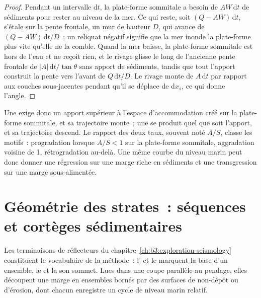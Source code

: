 \begin{proof}
Pendant un intervalle $\mathrm dt$, la plate-forme sommitale a besoin de $AW\,\mathrm dt$ de sédiments pour
rester au niveau de la mer. Ce qui reste, soit $(Q - AW)\,\mathrm dt$, s'étale sur la pente frontale,
un mur de hauteur $D$, qui avance de $(Q - AW)\,\mathrm dt/D$~; un reliquat négatif
signifie que la mer inonde la plate-forme plus vite qu'elle ne la comble. Quand la mer
baisse, la plate-forme sommitale est hors de l'eau et ne reçoit rien, et le rivage
glisse le long de l'ancienne pente frontale de $|A|\,\mathrm dt/\tan\theta$ sans
apport de sédiments, tandis que tout l'apport construit la pente vers l'avant de $Q\,\mathrm
dt/D$. Le rivage monte de $A\,\mathrm dt$ par rapport aux couches sous-jacentes
pendant qu'il se déplace de $\mathrm dx_s$, ce qui donne l'angle.
\end{proof}

Une  exige donc un apport supérieur à l'espace d'accommodation
créé sur la plate-forme sommitale, et sa trajectoire monte~; une  se produit
quel que soit l'apport, et sa trajectoire descend. Le rapport des deux taux,
souvent noté $A/S$, classe les motifs~: progradation lorsque $A/S < 1$ sur la
plate-forme sommitale, aggradation voisine de 1, rétrogradation au-delà. Une même courbe du niveau marin
peut donc donner une régression sur une marge riche en sédiments et une
transgression sur une marge sous-alimentée.

\section{Géométrie des strates~: séquences et cortèges sédimentaires}\label{sec:b3:sequence-stratigraphy:sequences}

Les terminaisons de réflecteurs du chapitre~\ref{ch:b3:exploration-seismology}
constituent le vocabulaire de la méthode~: l' et le  marquent la base d'un
ensemble, le  et la  son sommet. Lues dans une coupe parallèle au pendage, elles
découpent une marge en ensembles bornés par des surfaces de non-dépôt ou
d'érosion, dont chacun enregistre un cycle de niveau marin relatif.

